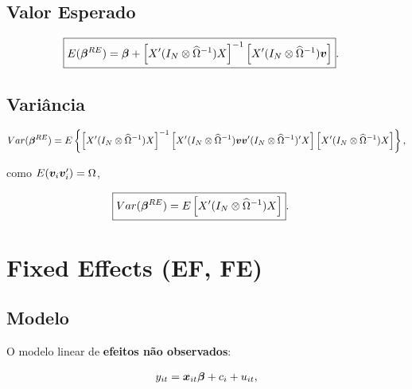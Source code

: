 \documentclass[11pt,oneside,a4paper]{article}
\numberwithin{equation}{section}
\begin{document}
\subsection*{Valor Esperado}

\vspace{-1 em}
\begin{align*}
	\Aboxed{
E( \mbs{\beta}^{RE} ) = 
\mbs{\beta} +
\left[ X' (I_{N} \otimes \widehat{\Omega}^{-1}) X \right]^{-1}
\left[ X' (I_{N} \otimes \widehat{\Omega}^{-1}) \mbs{v} \right] }.
\end{align*}

\subsection*{Variância}

\vspace{-1 em}
\begin{align*} 
Var( \boldsymbol{\beta}^{RE} ) = 
E
\left\{ 
\left[ X' ( I_{N} \otimes \widehat{\Omega}^{-1} ) X \right]^{-1}
\left[
X' ( I_{N} \otimes \widehat{\Omega}^{-1} )
\boldsymbol{v} \boldsymbol{v}'
( I_{N} \otimes \widehat{\Omega}^{-1} )' X
\right]
\left[ X' ( I_{N} \otimes \widehat{\Omega}^{-1} ) X \right]
\right\},
\end{align*}

\noindent
como $E( \boldsymbol{v}_{i} \boldsymbol{v}_{i}' ) =\Omega$,

\vspace{-1 em}
\begin{align*} 
	\Aboxed{
Var( \mbs{\beta}^{RE} ) = 
E
\left[ X' ( I_{N} \otimes \widehat{\Omega}^{-1} ) X \right] }.
\end{align*}

\clearpage
\section{Fixed Effects (EF, FE)}


\subsection*{Modelo}

O modelo linear de \textbf{efeitos não observados}:

\vspace{-1 em}
\begin{align} \label{mod1:FE}
	y_{it} = \boldsymbol{x}_{it} \boldsymbol{\beta} + c_{i} + u_{it},
\end{align}
\end{document}
